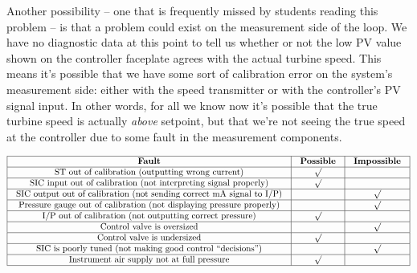 \vskip 10pt

Another possibility -- one that is frequently missed by students reading this problem -- is that a problem could exist on the measurement side of the loop.  We have no diagnostic data at this point to tell us whether or not the low PV value shown on the controller faceplate agrees with the actual turbine speed.  This means it's possible that we have some sort of calibration error on the system's measurement side: either with the speed transmitter or with the controller's PV signal input.  In other words, for all we know now it's possible that the true turbine speed is actually {\it above} setpoint, but that we're not seeing the true speed at the controller due to some fault in the measurement components.


$$\vbox{\offinterlineskip
\halign{\strut
\vrule \quad\hfil # \ \hfil & 
\vrule \quad\hfil # \ \hfil & 
\vrule \quad\hfil # \ \hfil \vrule \cr
\noalign{\hrule}
%
{\bf Fault} & {\bf Possible} & {\bf Impossible} \cr
%
\noalign{\hrule}
%
ST out of calibration (outputting wrong current) & $\surd$ &  \cr
%
\noalign{\hrule}
%
SIC input out of calibration (not interpreting signal properly) & $\surd$ &  \cr
%
\noalign{\hrule}
%
SIC output out of calibration (not sending correct mA signal to I/P) &  & $\surd$ \cr
%
\noalign{\hrule}
%
Pressure gauge out of calibration (not displaying pressure properly) &  & $\surd$ \cr
%
\noalign{\hrule}
%
I/P out of calibration (not outputting correct pressure) & $\surd$ &  \cr
%
\noalign{\hrule}
%
Control valve is oversized &  & $\surd$ \cr
%
\noalign{\hrule}
%
Control valve is undersized & $\surd$ &  \cr
%
\noalign{\hrule}
%
SIC is poorly tuned (not making good control ``decisions'') &  & $\surd$ \cr
%
\noalign{\hrule}
%
Instrument air supply not at full pressure & $\surd$ &  \cr
%
\noalign{\hrule}
} %
}$$ %




